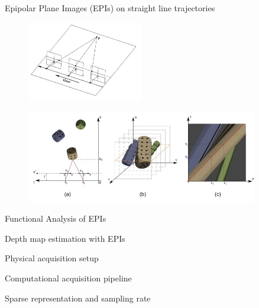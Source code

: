 \begin{frame}{Epipolar Plane Images (EPIs) on straight line trajectories}
\begin{figure}[h!]
\centering
\includegraphics[width=0.45\textwidth]{../../Diagrams/perp-move.jpg}
\end{figure}

\pause
\begin{figure}[h!]
\centering
\includegraphics[width=0.90\textwidth]{../../Diagrams/EPI-dices.jpg}
\end{figure}

\end{frame}

\begin{frame}{Functional Analysis of EPIs}

\end{frame}

\begin{frame}{Depth map estimation with EPIs}

\end{frame}

\begin{frame}{Physical acquisition setup}

\end{frame}

\begin{frame}{Computational acquisition pipeline}

\end{frame}

\begin{frame}{Sparse representation and sampling rate}

\end{frame}

